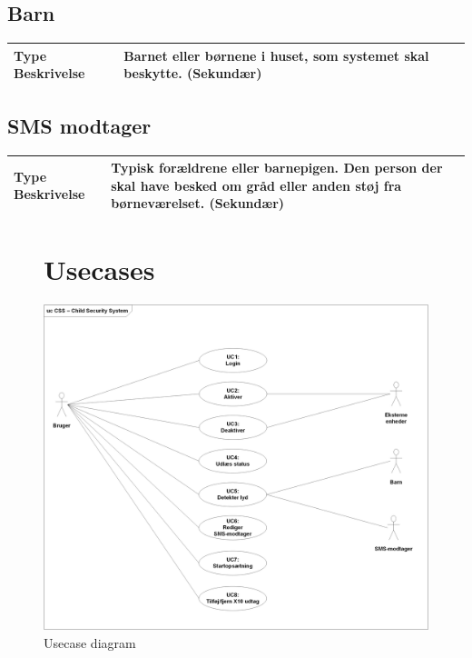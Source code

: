 \begin{table}[!htbp] \centering
\subsection{Barn}
\begin{tabular}{|p{4cm}|p{8cm}|}
	\hline
		\textbf{Type Beskrivelse} &
			Barnet eller børnene i huset, som systemet skal beskytte.	(Sekundær) \\\hline
	\end{tabular}
\end{table}

\begin{table}[!htbp] \centering
\subsection{SMS modtager}
\begin{tabular}{|p{4cm}|p{8cm}|}
	\hline
		\textbf{Type Beskrivelse} &
			Typisk forældrene eller barnepigen. Den person der skal have besked om gråd eller anden støj fra børneværelset. (Sekundær) \\\hline
	\end{tabular}
\end{table}

\begin{figure}[!htbp] \centering
\section{Usecases}
\vspace*{\fill}
\includegraphics[width=\textwidth]{billeder/Usecase_Diagram}
\caption{Usecase diagram}
\label{lab:usecasediagram}
\vspace*{\fill}
\end{figure}

